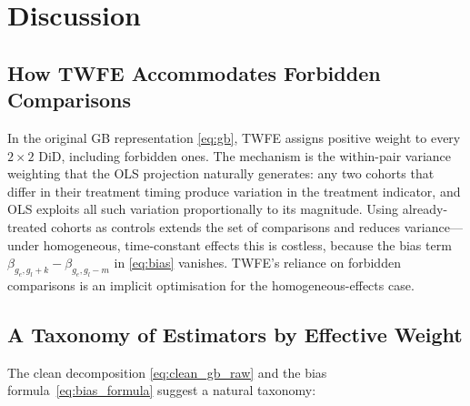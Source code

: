 \documentclass[12pt,letterpaper]{article}
\theoremstyle{remark}
\theoremstyle{definition}
\begin{document}
\section{Discussion}
\label{sec:discussion}

\subsection{How TWFE Accommodates Forbidden Comparisons}

In the original GB representation \eqref{eq:gb}, TWFE assigns positive weight
to every $2\times2$ DiD, including forbidden ones. The mechanism is the
within-pair variance weighting that the OLS projection naturally generates:
any two cohorts that differ in their treatment timing produce variation in the
treatment indicator, and OLS exploits all such variation proportionally to its
magnitude. Using already-treated cohorts as controls extends the set of
comparisons and reduces variance---under homogeneous, time-constant effects this
is costless, because the bias term $\beta_{g_e,g_l+k}-\beta_{g_e,g_l-m}$ in
\eqref{eq:bias} vanishes. TWFE's reliance on forbidden comparisons is an
implicit optimisation for the homogeneous-effects case.

\subsection{A Taxonomy of Estimators by Effective Weight}

The clean decomposition \eqref{eq:clean_gb_raw} and the bias
formula~\eqref{eq:bias_formula} suggest a natural taxonomy:
\end{document}
